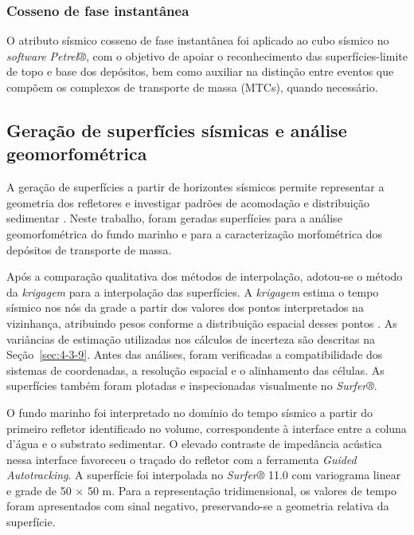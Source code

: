 \subsubsection{Cosseno de fase instantânea}\label{sec:4-1-1-1}

O atributo sísmico cosseno de fase instantânea foi aplicado ao cubo sísmico no \textit{software} \textit{Petrel®}, com o objetivo de apoiar o reconhecimento das superfícies-limite de topo e base dos depósitos, bem como auxiliar na distinção entre eventos que compõem os complexos de transporte de massa (MTCs), quando necessário.

\subsection{Geração de superfícies sísmicas e análise geomorfométrica}\label{sec:4-1-2}

A geração de superfícies a partir de horizontes sísmicos permite representar a geometria dos refletores e investigar padrões de acomodação e distribuição sedimentar \cite{preissler2016}. Neste trabalho, foram geradas superfícies para a análise geomorfométrica do fundo marinho e para a caracterização morfométrica dos depósitos de transporte de massa.

Após a comparação qualitativa dos métodos de interpolação, adotou-se o método da \textit{krigagem} para a interpolação das superfícies. A \textit{krigagem} estima o tempo sísmico nos nós da grade a partir dos valores dos pontos interpretados na vizinhança, atribuindo pesos conforme a distribuição espacial desses pontos \cite{davis2002}. As variâncias de estimação utilizadas nos cálculos de incerteza são descritas na Seção~\ref{sec:4-3-9}. Antes das análises, foram verificadas a compatibilidade dos sistemas de coordenadas, a resolução espacial e o alinhamento das células. As superfícies também foram plotadas e inspecionadas visualmente no \textit{Surfer®}.

O fundo marinho foi interpretado no domínio do tempo sísmico a partir do primeiro refletor identificado no volume, correspondente à interface entre a coluna d’água e o substrato sedimentar. O elevado contraste de impedância acústica nessa interface favoreceu o traçado do refletor com a ferramenta \textit{Guided Autotracking}. A superfície foi interpolada no \textit{Surfer®} 11.0 com variograma linear e grade de 50 × 50 m. Para a representação tridimensional, os valores de tempo foram apresentados com sinal negativo, preservando-se a geometria relativa da superfície.

